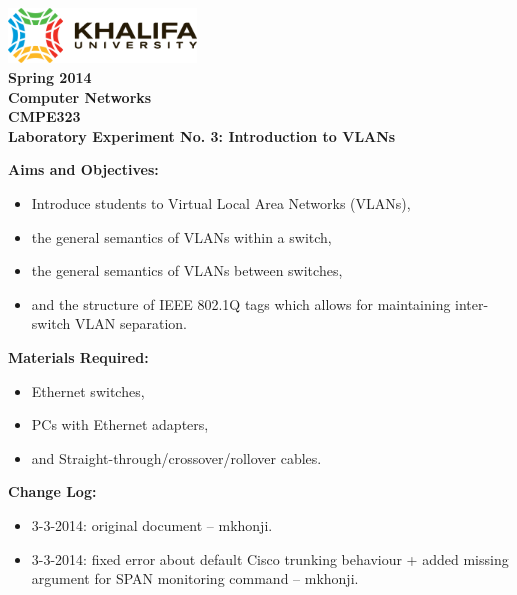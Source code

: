 \documentclass[pdftex,12pt,a4paper]{article}
\begin{document}
    \begin{titlepage}
        \begin{center}
            \includegraphics[width=5cm]{figures/kulogo}\\[1cm]
            {\Large \bfseries
                Spring 2014\\
                Computer Networks\\
                CMPE323\\[1cm]
            }
            {\large \bfseries
                \noindent Laboratory Experiment No. 3: Introduction to VLANs\\[1cm]
            }
        \end{center}

        \noindent \textbf{Aims and Objectives:}
            \begin{itemize}[leftmargin=4cm]
                \item Introduce students to Virtual Local Area Networks (VLANs),
                \item the general semantics of VLANs within a switch,
                \item the general semantics of VLANs between switches,
                \item and the structure of IEEE 802.1Q tags which allows for
                    maintaining inter-switch VLAN separation.
            \end{itemize}
            \vspace{0.5cm}

        \noindent \textbf{Materials Required:}
            \begin{itemize}[leftmargin=4cm]
                \item Ethernet switches,
                \item PCs with Ethernet adapters,
                \item and Straight-through/crossover/rollover cables.
            \end{itemize}
            \vspace{0.5cm}

        \noindent \textbf{Change Log:}
            \begin{itemize}[leftmargin=4cm]
                \item 3-3-2014: original document -- mkhonji.
                \item 3-3-2014: fixed error about default Cisco trunking
                    behaviour + added missing argument for SPAN monitoring
                    command -- mkhonji.
            \end{itemize}
    \end{titlepage}
    \newpage
\end{document}
